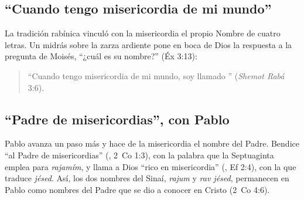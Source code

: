 \subsection{“Cuando tengo misericordia de mi mundo”}
La tradición rabínica vinculó con la misericordia el propio Nombre de cuatro letras. Un midrás sobre la zarza ardiente pone en boca de Dios la respuesta a la pregunta de Moisés, ``¿cuál es su nombre?'' (Éx 3:13):

\begin{quote}\small
{}\par\smallskip
``Cuando tengo misericordia de mi mundo, soy llamado \SENOR{}'' (\emph{Shemot Rabá} 3:6).
\end{quote}


\subsection{“Padre de misericordias”, con Pablo}
Pablo avanza un paso más y hace de la misericordia el nombre del Padre. Bendice ``al Padre de misericordias'' (, 2~Co 1:3), con la palabra que la Septuaginta emplea para \emph{rajamím}, y llama a Dios ``rico en misericordia'' (, Ef 2:4), con la que traduce \emph{jésed}. Así, los dos nombres del Sinaí, \emph{rajum} y \emph{rav jésed}, permanecen en Pablo como nombres del Padre que se dio a conocer en Cristo (2~Co 4:6).

